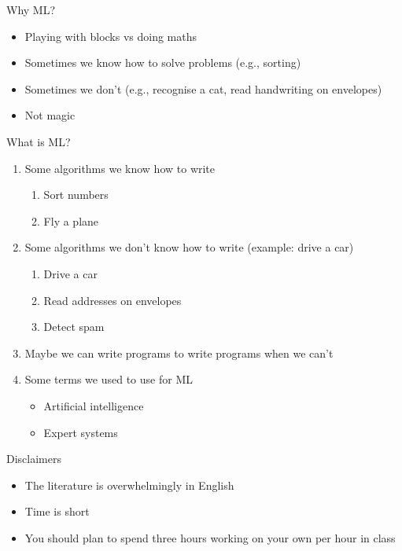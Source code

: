 




Why ML?
\begin{itemize}
\item Playing with blocks vs doing maths
\item Sometimes we know how to solve problems (e.g., sorting)
\item Sometimes we don't (e.g., recognise a cat, read handwriting on envelopes)
\item Not magic
\end{itemize}

What is ML?
\begin{enumerate}
\item Some algorithms we know how to write
  \begin{enumerate}
  \item Sort numbers
  \item Fly a plane
  \end{enumerate}
\item Some algorithms we don't know how to write (example: drive a car)
  \begin{enumerate}
  \item Drive a car 
  \item Read addresses on envelopes
  \item Detect spam
  \end{enumerate}
\item Maybe we can write programs to write programs when we can't
\item Some terms we used to use for ML
  \begin{itemize}
  \item Artificial intelligence
  \item Expert systems
  \end{itemize}
\end{enumerate}

Disclaimers
\begin{itemize}
\item The literature is overwhelmingly in English
\item Time is short
\item You should plan to spend three hours working on your own per hour in class
\end{itemize}

